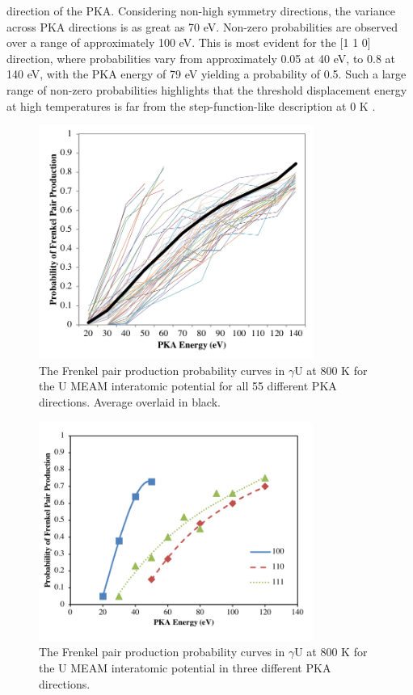 \documentclass[review]{elsarticle}
\begin{document}
direction of the PKA. Considering non-high symmetry directions, the variance across PKA directions is as great as 70 eV. Non-zero probabilities are observed over a range of approximately 100 eV. This is most evident for the [1 1 0] direction, where probabilities vary from approximately 0.05 at 40 eV, to 0.8 at 140 eV, with the PKA energy of 79 eV yielding a probability of 0.5. Such a large range of non-zero probabilities highlights that the threshold displacement energy at high temperatures is far from the step-function-like description at 0 K \cite{was2007}.
 
 \begin{figure}[h]
 \centering
 \includegraphics[width=0.8\textwidth]{ed_dir_allD.png} 
 \caption{The Frenkel pair production probability curves in $\gamma$U at 800 K for the U MEAM interatomic potential for all 55 different PKA directions. Average overlaid in black.}
 \label{fig:ed_dirall}
\end{figure}
 
\begin{figure}[h]
 \centering
 \includegraphics[width=0.8\textwidth]{ed_dirBrev.png} 
 \caption{The Frenkel pair production probability curves in $\gamma$U at 800 K for the U MEAM interatomic potential in three different PKA directions.}
 \label{fig:ed_dir}
\end{figure}
\end{document}
